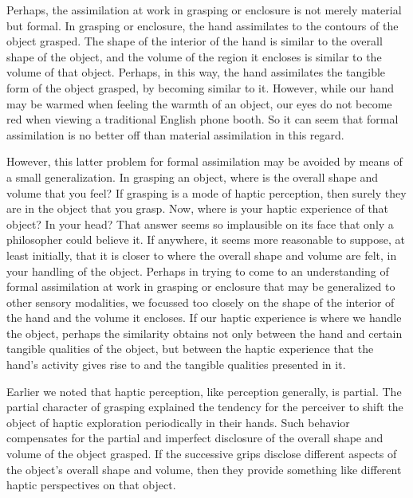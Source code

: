 \documentclass[12pt]{article}
\begin{document}
Perhaps, the assimilation at work in grasping or enclosure is not merely material but formal. In grasping or enclosure, the hand assimilates to the contours of the object grasped. The shape of the interior of the hand is similar to the overall shape of the object, and the volume of the region it encloses is similar to the volume of that object. Perhaps, in this way, the hand assimilates the tangible form of the object grasped, by becoming similar to it. However, while our hand may be warmed when feeling the warmth of an object, our eyes do not become red when viewing a traditional English phone booth. So it can seem that formal assimilation is no better off than material assimilation in this regard.

However, this latter problem for formal assimilation may be avoided by means of a small generalization. In grasping an object, where is the overall shape and volume that you feel? If grasping is a mode of haptic perception, then surely they are in the object that you grasp. Now, where is your haptic experience of that object? In your head? That answer seems so implausible on its face that only a philosopher could believe it. If anywhere, it seems more reasonable to suppose, at least initially, that it is closer to where the overall shape and volume are felt, in your handling of the object. Perhaps in trying to come to an understanding of formal assimilation at work in grasping or enclosure that may be generalized to other sensory modalities, we focussed too closely on the shape of the interior of the hand and the volume it encloses. If our haptic experience is where we handle the object, perhaps the similarity obtains not only between the hand and certain tangible qualities of the object, but between the haptic experience that the hand's activity gives rise to and the tangible qualities presented in it.

Earlier we noted that haptic perception, like perception generally, is partial. The partial character of grasping explained the tendency for the perceiver to shift the object of haptic exploration periodically in their hands. Such behavior compensates for the partial and imperfect disclosure of the overall shape and volume of the object grasped. If the successive grips disclose different aspects of the object's overall shape and volume, then they provide something like different haptic perspectives on that object. 
\end{document}
